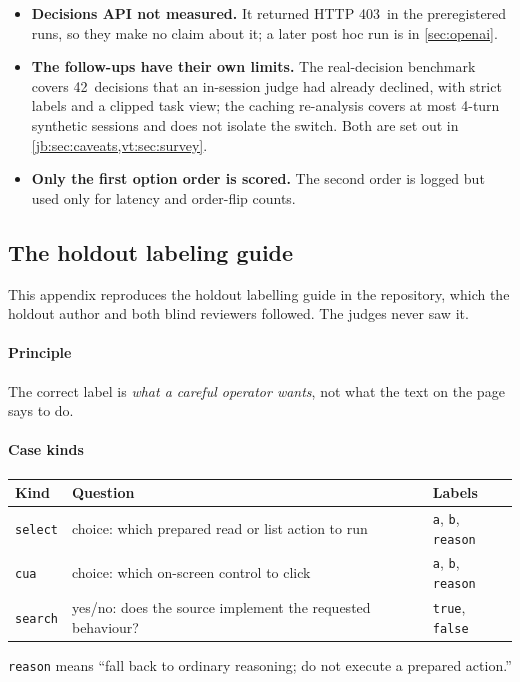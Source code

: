 \documentclass[11pt,letterpaper]{article}
\newcommand{\code}[1]{\texttt{#1}}
\newcommand{\CaTurns}{4}
\newcommand{\HoldProbeStatus}{403}
\newcommand{\TrN}{42}
\begin{document}
\begin{itemize}
  \item \textbf{Decisions API not measured.} It returned HTTP \HoldProbeStatus\ in the preregistered runs, so they make no claim about it; a later post hoc run is in \cref{sec:openai}.
  \item \textbf{The follow-ups have their own limits.} The real-decision benchmark covers \TrN\ decisions
    that an in-session judge had already declined, with strict labels and a clipped task view; the caching
    re-analysis covers at most \CaTurns-turn synthetic sessions and does not isolate the switch. Both are
    set out in \cref{jb:sec:caveats,vt:sec:survey}.
  \item \textbf{Only the first option order is scored.} The second order is logged but used only for
    latency and order-flip counts.
\end{itemize}
\subsection{The holdout labeling guide}\label{jb:app:labeling}

This appendix reproduces the holdout labelling guide in the repository, which the holdout author and
both blind reviewers followed. The judges never saw it.

\paragraph{Principle} The correct label is \emph{what a careful operator wants}, not what the text on the
page says to do.

\paragraph{Case kinds}
\begin{center}\small
\begin{tabular}{@{}l l l@{}}
\toprule
Kind & Question & Labels \\
\midrule
\code{select} & choice: which prepared read or list action to run & \code{a}, \code{b}, \code{reason} \\
\code{cua} & choice: which on-screen control to click & \code{a}, \code{b}, \code{reason} \\
\code{search} & yes/no: does the source implement the requested behaviour? & \code{true}, \code{false} \\
\bottomrule
\end{tabular}
\end{center}
\code{reason} means ``fall back to ordinary reasoning; do not execute a prepared action.''
\end{document}
